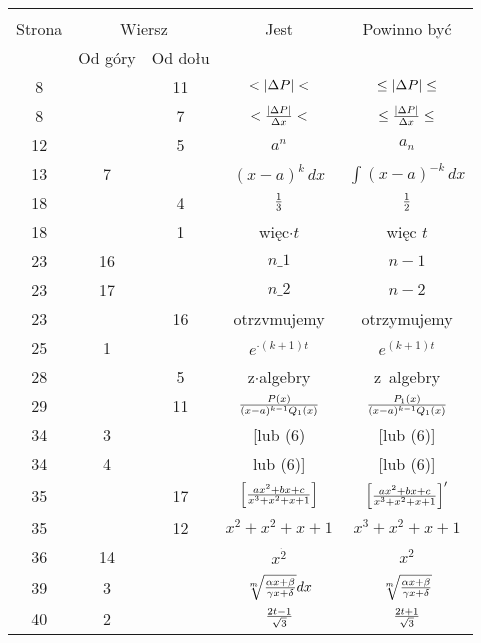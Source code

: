 \documentclass[a4paper,11pt]{article}
\begin{document}
\vspace{\spaceFour}


\begin{center}
  \begin{tabular}{|c|c|c|c|c|}
    \hline
    & \multicolumn{2}{c|}{} & & \\
    Strona & \multicolumn{2}{c|}{Wiersz} & Jest
                              & Powinno być \\ \cline{2-3}
    & Od góry & Od dołu & & \\
    \hline
    8   & & 11 & $< | \Delta P | <$ & $\leq | \Delta P | \leq$ \\
    8   & &  7 & $< \frac{ | \Delta P | }{ \Delta x } <$
           & $\leq \frac{ | \Delta P | }{ \Delta x } \leq$ \\
    12  & &  5 & $a^{ n }$ & $a_{ n }$ \\
    13  &  7 & & $( x - a )^{ k }\, dx$ & $\int ( x - a )^{ -k }\, dx$ \\
    18  & &  4 & $\frac{ 1 }{ 3 }$ & $\frac{ 1 }{ 2 }$ \\
    18  & &  1 & więc$\cdot t$ & więc $t$ \\
    23  & 16 & & $n \_ 1$ & $n - 1$ \\
    23  & 17 & & $n \_ 2$ & $n - 2$ \\
    23  & & 16 & otrzvmujemy & otrzymujemy \\
    25  &  1 & & $e^{ \cdot (k + 1) t}$ & $e^{ (k + 1) t}$ \\
    28  & &  5 & z$\cdot$algebry & z~algebry \\
    29  & & 11 & $\frac{ P(x) }{ (x - a)^{k - 1} Q_{ 1 }(x) }$
           & $\frac{ P_{ 1 }(x) }{ (x - a)^{k - 1} Q_{ 1 }(x) }$ \\
    34  &  3 & & [lub (6) & [lub (6)] \\
    34  &  4 & & lub (6)] & [lub (6)] \\
    35  & & 17 & $\left[ \frac{ a x^{ 2 } + b x + c }
                 { x^{ 3 } + x^{ 2 } + x + 1 } \right]$
           & $\left[ \frac{ a x^{ 2 } + b x + c }
             { x^{ 3 } + x^{ 2 } + x + 1 } \right]'$ \\
    35  & & 12 & $x^{ 2 } + x^{ 2 } + x + 1$
           & $x^{ 3 } + x^{ 2 } + x + 1$ \\
    36  & 14 & & $x^{ \dot{ 2 } }$ & $x^{ 2 }$ \\
    39  &  3 & & $\sqrt[ m ]{ \frac{ \alpha x + \beta }{ \gamma x + \delta } } dx$
           & $\sqrt[ m ]{ \frac{ \alpha x + \beta }{ \gamma x + \delta } }$ \\
    40  &  2 & & $\frac{ 2t - 1 }{ \sqrt{ 3 } }$
           & $\frac{ 2t + 1 }{ \sqrt{ 3 } }$ \\
    \hline
  \end{tabular}


\end{center}
\end{document}
